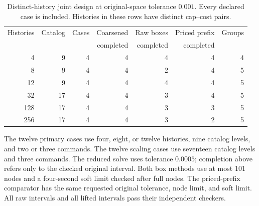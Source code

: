 \begin{table}[p]\centering
\caption{Distinct-history joint design at original-space tolerance $0.001$. Every declared case is included. Histories in these rows have distinct cap--cost pairs.}\label{tab:r47-joint}
\begin{tabular}{rrrrrrr}\toprule
Histories & Catalog & Cases & Coarsened & Raw boxes & Priced prefix & Groups \\
 & & & completed & completed & completed & \\\midrule
4 & 9 & 4 & 4 & 4 & 4 & 4 \\
8 & 9 & 4 & 4 & 2 & 4 & 5 \\
12 & 9 & 4 & 4 & 4 & 4 & 5 \\
32 & 17 & 4 & 4 & 3 & 4 & 5 \\
128 & 17 & 4 & 4 & 3 & 3 & 5 \\
256 & 17 & 4 & 4 & 3 & 2 & 5 \\
\bottomrule\end{tabular}
\par\smallskip\raggedright The twelve primary cases use four, eight, or twelve histories, nine catalog levels, and two or three commands. The twelve scaling cases use seventeen catalog levels and three commands. The reduced solve uses tolerance $0.0005$; completion above refers only to the checked original interval. Both box methods use at most 101 nodes and a four-second soft limit checked after full nodes. The priced-prefix comparator has the same requested original tolerance, node limit, and soft limit. All raw intervals and all lifted intervals pass their independent checkers.
\end{table}
